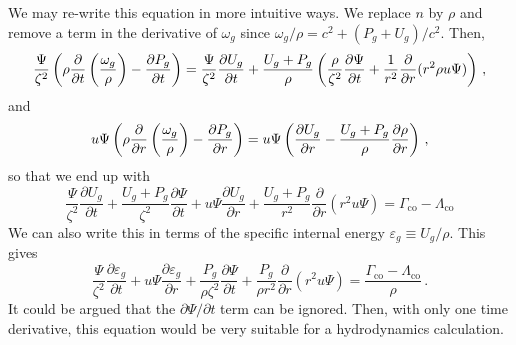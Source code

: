 \documentclass[../main.tex]{subfiles}
\begin{document}
We may re-write this equation in more intuitive ways. We replace $n$ by $\rho$ and remove a term in the derivative of $\omega_g$ since $\omega_g/\rho=c^2+(P_g+U_g)/c^2$. Then,
\begin{equation*}
    \frac{\Psi}{\zeta^2}\left(\rho\frac{\partial}{\partial t}\left(\frac{\omega_g}{\rho}\right)-\frac{\partial P_g}{\partial t}\right)=\frac{\Psi}{\zeta^2}\frac{\partial U_g}{\partial t}+\frac{U_g+P_g}{\rho}\left(\frac{\rho}{\zeta^2}\frac{\partial \Psi}{\partial t}+\frac{1}{r^2}\frac{\partial}{\partial r}(r^2\rho u\Psi)\right)\,,
\end{equation*}
and
\begin{equation*}
    u\Psi\left(\rho\frac{\partial}{\partial r}\left(\frac{\omega_g}{\rho}\right)-\frac{\partial P_g}{\partial r}\right)=u\Psi\left(\frac{\partial U_g}{\partial r}-\frac{U_g+P_g}{\rho}\frac{\partial \rho}{\partial r}\right)\,,
\end{equation*}
so that we end up with
\begin{equation}
    \frac{\Psi}{\zeta^2}\frac{\partial U_g}{\partial t}+\frac{U_g+P_g}{\zeta^2}\frac{\partial \Psi}{\partial t}+u\Psi\frac{\partial U_g}{\partial r}+\frac{U_g+P_g}{r^2}\frac{\partial}{\partial r}(r^2u\Psi)=\Gamma_\text{co}-\Lambda_\text{co}
\end{equation}
We can also write this in terms of the specific internal energy $\varepsilon_g\equiv U_g/\rho$.  This gives
\begin{equation}\label{eq:specific_internal_energy}
    \frac{\Psi}{\zeta^2}\frac{\partial \varepsilon_g}{\partial t}+u\Psi\frac{\partial \varepsilon_g}{\partial r}+\frac{P_g}{\rho\zeta^2}\frac{\partial \Psi}{\partial t}+\frac{P_g}{\rho r^2}\frac{\partial}{\partial r}(r^2u\Psi)=\frac{\Gamma_\text{co}-\Lambda_\text{co}}{\rho}\,.
\end{equation}
It could be argued that the $\partial \Psi/\partial t$ term can be ignored.  Then, with only one time derivative, this equation would be very suitable for a hydrodynamics calculation.
\end{document}
